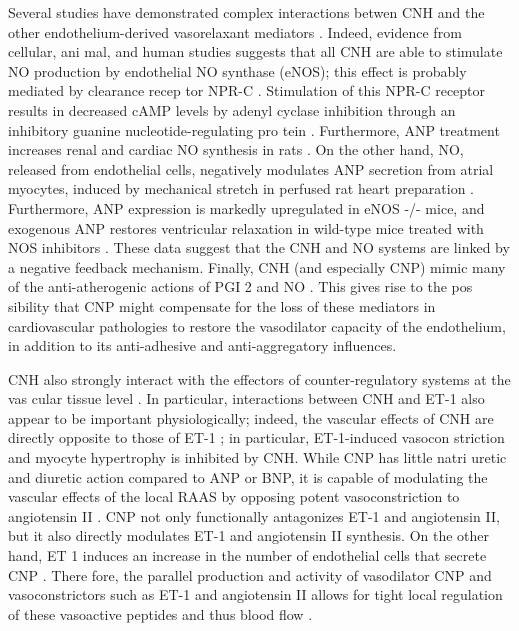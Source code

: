 \documentclass[14pt,a4paper,onecolumn]{extarticle}
\begin{document}
Several studies have demonstrated complex interactions betwen CNH and the other endothelium-derived vasorelaxant mediators \citep{267}. Indeed, evidence from cellular, ani mal, and human studies suggests that all CNH are able to stimulate NO production by endothelial NO synthase (eNOS); this effect is probably mediated by clearance recep tor NPR-C \citep{270}. Stimulation of this NPR-C receptor results in decreased cAMP levels by adenyl cyclase inhibition through an inhibitory guanine nucleotide-regulating pro tein \citep{270}. Furthermore, ANP treatment increases renal and cardiac NO synthesis in rats \citep{274}. On the other hand, NO, released from endothelial cells, negatively modulates ANP secretion from atrial myocytes, induced by mechanical stretch in perfused rat heart preparation \citep{275}. Furthermore, ANP expression is markedly upregulated in eNOS -/- mice, and exogenous ANP restores ventricular relaxation in wild-type mice treated with NOS inhibitors \citep{276}. These data suggest that the CNH and NO systems are linked by a negative feedback mechanism. Finally, CNH (and especially CNP) mimic many of the anti-atherogenic actions of PGI 2 and NO \citep{267}. This gives rise to the pos sibility that CNP might compensate for the loss of these mediators in cardiovascular pathologies to restore the vasodilator capacity of the endothelium, in addition to its anti-adhesive and anti-aggregatory influences.

CNH also strongly interact with the effectors of counter-regulatory systems at the vas cular tissue level \citep{13} \citep{28} \citep{30} \citep{77} \citep{78} \citep{90} \citep{91} \citep{92} \citep{93} \citep{94} \citep{95} \citep{96} \citep{97} \citep{98} \citep{99}. In particular, interactions between CNH and ET-1 also appear to be important physiologically; indeed, the vascular effects of CNH are directly opposite to those of ET-1 \citep{267} \citep{269}; in particular, ET-1-induced vasocon striction and myocyte hypertrophy is inhibited by CNH. While CNP has little natri uretic and diuretic action compared to ANP or BNP, it is capable of modulating the vascular effects of the local RAAS by opposing potent vasoconstriction to angiotensin II \citep{269}. CNP not only functionally antagonizes ET-1 and angiotensin II, but it also directly modulates ET-1 \citep{277} and angiotensin II \citep{278} synthesis. On the other hand, ET 1 induces an increase in the number of endothelial cells that secrete CNP \citep{279}. There fore, the parallel production and activity of vasodilator CNP and vasoconstrictors such as ET-1 and angiotensin II allows for tight local regulation of these vasoactive peptides and thus blood flow \citep{267} \citep{269} \citep{279}.
\end{document}
